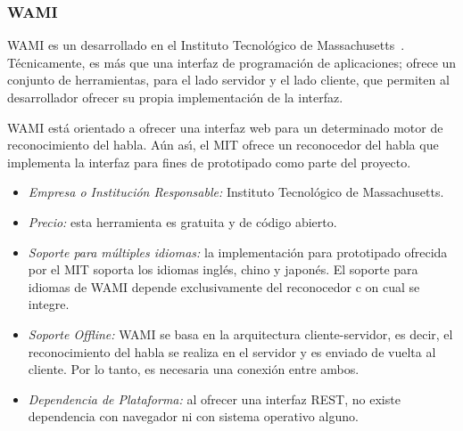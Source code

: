 \subsubsection{WAMI}
\label{sec:wami}

WAMI es un  desarrollado en el Instituto Tecnol\'ogico de
\mbox{Massachusetts \cite{WamiHome}}. T\'ecnicamente, es m\'as que una interfaz de programaci\'on
de aplicaciones; ofrece un conjunto de herramientas, para el lado servidor y el lado cliente,
que permiten al desarrollador ofrecer su propia implementaci\'on de la interfaz.

WAMI est\'a orientado a ofrecer una interfaz web para un determinado motor de reconocimiento del habla. 
A\'un as{\'\i}, el MIT ofrece un reconocedor del habla que implementa la interfaz para fines 
de prototipado como parte del proyecto.

\begin{itemize}
	\item \emph{Empresa o Instituci\'on Responsable:} Instituto Tecnol\'ogico de Massachusetts.
	\item \emph{Precio:} esta herramienta es gratuita y de c\'odigo abierto.
	\item \emph{Soporte para m\'ultiples idiomas:} la implementaci\'on para prototipado ofrecida
	por el MIT soporta los idiomas ingl\'es, chino y japon\'es. El soporte para idiomas de WAMI
	depende exclusivamente del reconocedor c on cual se integre.
	\item \emph{Soporte Offline:} WAMI se basa en la arquitectura cliente-servidor, es decir, el reconocimiento del habla 
    se realiza en el servidor y es enviado de vuelta al cliente. Por lo tanto, es necesaria una conexi\'on entre ambos.
	\item \emph{Dependencia de Plataforma:} al ofrecer una interfaz REST, no existe dependencia con
	navegador ni con sistema operativo alguno.
\end{itemize}
